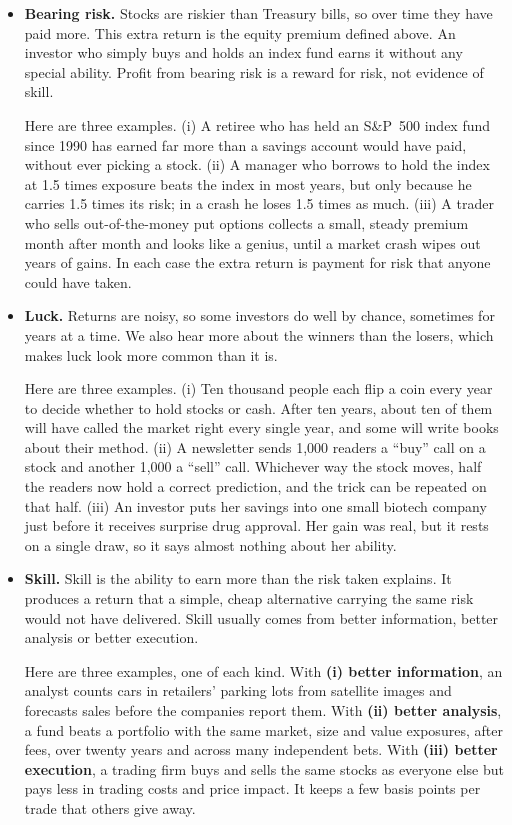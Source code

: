 \begin{itemize}
  \item \textbf{Bearing risk.} Stocks are riskier than Treasury bills, so over
  time they have paid more. This extra return is the equity premium defined
  above. An investor who simply buys and holds an index fund earns it without
  any special ability. Profit from bearing risk is a reward for risk, not
  evidence of skill.

  Here are three examples. (i) A retiree who has held an S\&P~500 index fund since
  1990 has earned far more than a savings account would have paid, without
  ever picking a stock. (ii) A manager who borrows to hold the index at
  1.5 times exposure beats the index in most years, but only because he
  carries 1.5 times its risk; in a crash he loses 1.5 times as much.
  (iii) A trader who sells out-of-the-money put options collects a small,
  steady premium month after month and looks like a genius, until a market
  crash wipes out years of gains. In each case the extra return is payment
  for risk that anyone could have taken.

  \item \textbf{Luck.} Returns are noisy, so some investors do well by
  chance, sometimes for years at a time. We also hear more about the winners
  than the losers, which makes luck look more common than it is.

  Here are three examples. (i) Ten thousand people each flip a coin every year to
  decide whether to hold stocks or cash. After ten years, about ten of them
  will have called the market right every single year, and some will write
  books about their method. (ii) A newsletter sends 1{,}000 readers a
  ``buy'' call on a stock and another 1{,}000 a ``sell'' call. Whichever way
  the stock moves, half the readers now hold a correct prediction, and the
  trick can be repeated on that half. (iii) An investor puts her savings into
  one small biotech company just before it receives surprise drug approval.
  Her gain was real, but it rests on a single draw, so it says almost nothing
  about her ability.


  \item \textbf{Skill.} Skill is the ability to earn more than the risk taken
  explains. It produces a return that a simple, cheap alternative carrying the
  same risk would not have delivered. Skill usually comes from better
  information, better analysis or better execution.

  Here are three examples, one of each kind. 
  With \textbf{(i) better
  information}, an analyst counts cars in retailers' parking lots from
  satellite images and forecasts sales before the companies report them.
  With \textbf{(ii) better analysis}, a fund beats a portfolio with the same
  market, size and value exposures, after fees, over twenty years and across
  many independent bets. 
  With \textbf{(iii) better execution}, a trading firm
  buys and sells the same stocks as everyone else but pays less in trading
  costs and price impact. It keeps a few basis points per trade that others
  give away.


\end{itemize}
